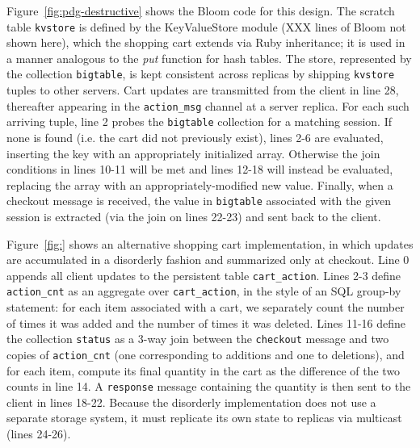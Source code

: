 Figure~\ref{fig:pdg-destructive} shows the Bloom code for this design.
The 
scratch table \texttt{kvstore} is defined by the KeyValueStore module (XXX lines of Bloom not shown here), 
which the shopping cart extends via Ruby inheritance; it is used in a manner
analogous to the \emph{put} function for hash tables.  
The store, represented by the collection \texttt{bigtable}, is kept 
consistent across replicas by shipping \texttt{kvstore} tuples to other servers.
Cart updates are transmitted from the client in line 28,
thereafter appearing in the \texttt{action\_msg} channel at a server replica.
For each such arriving tuple,
line 2 probes the \texttt{bigtable} collection for a matching
session.  If none is found (i.e. the cart did not previously exist), lines 2-6 are evaluated, inserting
the key with an appropriately initialized array. 
Otherwise the join conditions
in lines 10-11 will be met and lines 12-18 will instead be evaluated, replacing the array
with an appropriately-modified new value.
Finally, when a checkout message is received, the value in \texttt{bigtable}
associated with the given session is extracted (via the join on lines 22-23)
and sent back to the client.

Figure~\ref{fig:} shows an alternative shopping cart implementation, in which
updates are accumulated in a disorderly fashion and summarized only at 
checkout.  Line 0 appends all client updates to the persistent table 
\texttt{cart\_action}.  Lines 2-3 define \texttt{action\_cnt} as an aggregate
over \texttt{cart\_action}, in the style of an SQL group-by statement: for
each item associated with a cart, we separately count the number of times it was added and the number of times it was deleted.
Lines 11-16 define the collection \texttt{status} as a 3-way
join between the \texttt{checkout} message and two copies of 
\texttt{action\_cnt} (one corresponding to additions and one to deletions),
and for each item, compute its final quantity in the cart as the difference of the two counts
in line 14.  A \texttt{response} message containing the quantity is then sent 
to the client in lines 18-22.  Because the disorderly implementation does not
use a separate storage system, it must replicate its own state to replicas 
via multicast (lines 24-26).



